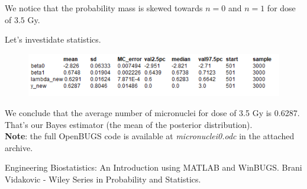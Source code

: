 \documentclass[a4 paper]{article}
\begin{document}
We notice that the probability mass is skewed towards
$n=0$ and $n=1$ for dose of $3.5$ Gy.

Let's investidate statistics.

\begin{figure}[H]
	\includegraphics[scale=1.0]{q3_2}
	\centering
	\label{q3_2}
\end{figure}

We conclude that the average number 
of micronuclei for dose of 3.5 Gy 
is 0.6287. That's our Bayes estimator (the mean 
of the posterior distribution). \\


\textbf{Note}: the full OpenBUGS code is available 
at \textit{micronuclei0.odc} in the attached archive.



\begin{thebibliography}{9}


\label{stat} 
Engineering Biostatistics: An Introduction using MATLAB and WinBUGS. 
Brani Vidakovic - Wiley Series in Probability and Statistics.

\end{thebibliography}
\end{document}
